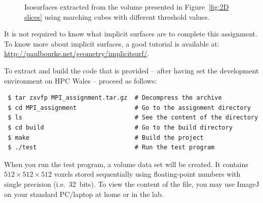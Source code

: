 \documentclass[11pt,oneside,a4paper,final]{article}
\begin{document}
\begin{figure}[tb]
	\centering
	\quad
	\quad
	\quad
	
 \caption{\label{fig:3D rendering} Isosurfaces extracted from the volume presented in Figure~\ref{fig:2D slices} using marching cubes with different threshold values.}
\end{figure}

It is not required to know what implicit surfaces are to complete this assignment. 
To know more about implicit surfaces, a good tutorial is available at:
\url{http://paulbourke.net/geometry/implicitsurf/}.

To extract and build the code that is provided -- after having set the development environment on HPC Wales -- proceed as follows:
\begin{footnotesize}
\begin{verbatim}
 $ tar zxvfp MPI_assignment.tar.gz  # Decompress the archive
 $ cd MPI_assignment                # Go to the assignment directory
 $ ls                               # See the content of the directory
 $ cd build                         # Go to the build directory
 $ make                             # Build the project
 $ ./test                           # Run the test program
\end{verbatim}
\end{footnotesize}
When you run the test program, a volume data set will be created. 
It contains $512 \times 512 \times 512$ voxels stored sequentially using floating-point numbers with single precision (i.e.~32~bits).
To view the content of the file, you may use ImageJ on your standard PC/laptop at home or in the lab.
\end{document}
